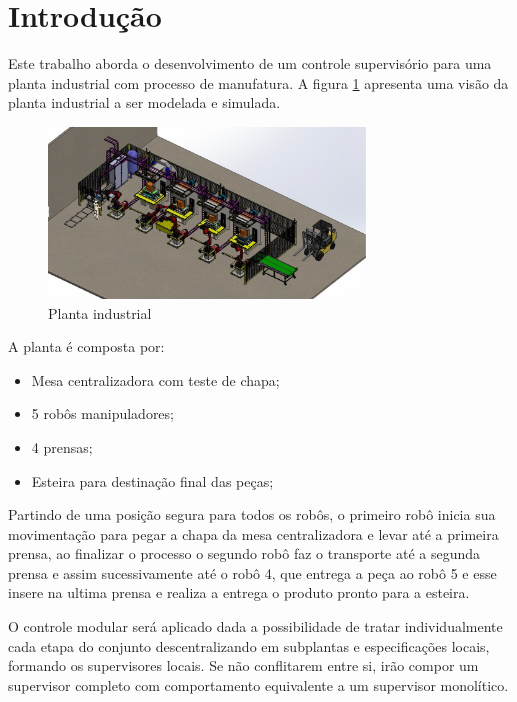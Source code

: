 \section{Introdução}

Este trabalho aborda o desenvolvimento de um controle supervisório para uma planta industrial com processo de  manufatura. A figura \ref{fig:processo} apresenta uma visão da planta industrial a ser modelada e simulada.


\begin{figure}[h]%
	\centering
	\includegraphics[width=0.75\textwidth]{imagens/processo.eps}
	\caption{Planta industrial}\label{fig:processo}
\end{figure}

A planta é composta por:
\begin{itemize}
    \item Mesa centralizadora com teste de chapa;
    \item 5 robôs manipuladores;
    \item 4 prensas;
    \item Esteira para destinação final das peças;
\end{itemize}

Partindo de uma posição segura para todos os robôs, o primeiro robô inicia sua movimentação para pegar a chapa da mesa centralizadora e levar até a primeira prensa, ao finalizar o processo o segundo robô faz o transporte até a segunda prensa e assim sucessivamente até o robô 4, que entrega a peça ao robô 5 e esse insere na ultima prensa e realiza a entrega o produto pronto para a esteira. 

O controle modular será aplicado dada a possibilidade de tratar individualmente cada etapa do conjunto descentralizando em subplantas e especificações locais, formando os supervisores locais. Se não conflitarem entre si, irão compor um supervisor completo com comportamento equivalente a um supervisor monolítico.